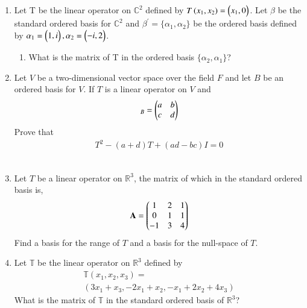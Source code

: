 \renewcommand{\theequation}{\theenumi}
\renewcommand{\thefigure}{\theenumi}
\begin{enumerate}[label=\thesubsection.\arabic*.,ref=\thesubsection.\theenumi]
%
\item Let T be the linear operator on $\mathbb{C}^{2}$ defined by $T\left(x_1 , x_2\right)=\begin{pmatrix}x_1 , 0\end{pmatrix}$.
Let $\beta$ be the standard ordered basis for $\mathbb{C}^{2}$ and $\beta^{'}=\{\alpha_1 , \alpha_2\}$
be the ordered basis defined by $\alpha_1 = \begin{pmatrix}1 , i\end{pmatrix} , \alpha_2 = \begin{pmatrix}-i , 2\end{pmatrix}$.
\begin{enumerate}
\item What is the matrix of T in the ordered basis $\{\alpha_2,\alpha_1\}$?
%
%
\\
\solution

\end{enumerate}
%
\item Let $V$ be a two-dimensional vector space over the field $F$ and let $B$ be an ordered basis for $V$. If $T$ is a linear operator on $V$ and 
\begin{align}
[T]_B = \myvec{a & b\\c & d}
\end{align}
Prove that 
\begin{align}
T^2 - (a+d)T + (ad-bc)I = 0
\end{align}
%
\\
\solution

\item Let $T$ be a linear operator on $\mathbb{R}^3$, the matrix of which in the standard ordered basis is,
\begin{align}
\mathbf{A} = \begin{pmatrix}1&2&1\\0&1&1\\-1&3&4\end{pmatrix} 
\end{align}
Find a basis for the range of $T$ and a basis for the null-space of $T$.
%
\\
\solution

\item Let $\mathbb{T}$ be the linear operator on $\mathbb{R}^3$ defined by 
\begin{align}
    \mathbb{T}(x_1,x_2,x_3)=\\(3x_1+x_3,-2x_1+x_2,-x_1+2x_2+4x_3)\label{eq:solutions/3/4/7/a/1}
\end{align}
What is the matrix of $\mathbb{T}$ in the standard ordered basis of $\mathbb{R}^3$?
%
\\
\solution


\end{enumerate}
